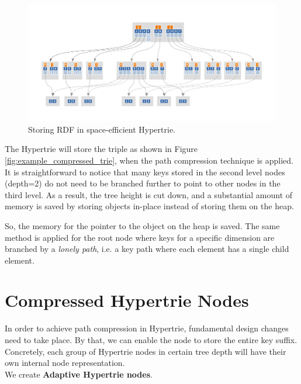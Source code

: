 \begin{figure}
	\centering
	\includegraphics[scale=0.74]{figures/chapter4/compressedBHT}
	\caption{Storing RDF in space-efficient Hypertrie.}
	\label{fig:rdf_compressed_hypertrie}
\end{figure}

\clearpage

The Hypertrie will store the triple as shown in Figure \ref{fig:example_compressed_trie},  when the path compression technique is applied. It is straightforward to notice that many keys stored in the second level nodes (depth=2) do not need to be branched further to point to other nodes in the third level. 
As a result, the tree height is cut down, and a substantial amount of memory is saved by storing objects in-place instead of storing them on the heap. 

So, the memory for the pointer to the object on the heap is saved. 
The same method is applied for the root node where keys for a specific dimension are branched by a \textit{lonely path}, i.e. a key path where each element has a single child element. \\

\section{Compressed Hypertrie Nodes}
In order to achieve path compression in Hypertrie, fundamental design changes need to take place. 
By that, we can enable the node to store the entire key suffix. 
Concretely, each group of Hypertrie nodes in certain tree depth will have their own internal node representation.  \\

We create \textbf{Adaptive Hypertrie nodes}. \\

